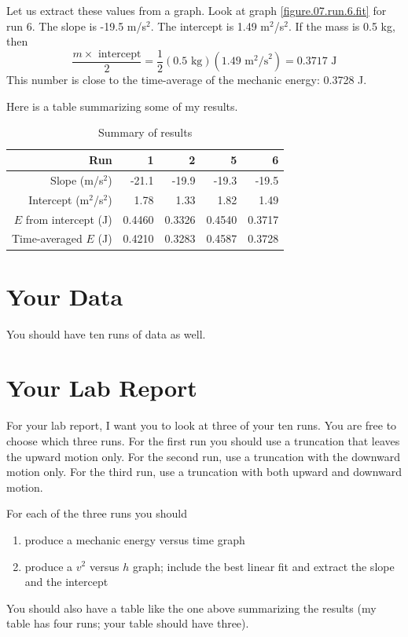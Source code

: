 Let us extract these values from a graph. Look at graph \ref{figure.07.run.6.fit} for run 6. The slope is -19.5 m/s$^{2}$. The intercept is 1.49 m$^{2}$/s$^{2}$. If the mass is 0.5 kg, then
\begin{equation}
    \frac{m \times \text{ intercept}}{2} = \frac{1}{2} (0.5 \text{ kg}) (1.49 \text{ m}^{2}\text{/s}^{2}) = 0.3717 \text{ J}
\end{equation}
This number is close to the time-average of the mechanic energy: 0.3728 J.

Here is a table summarizing some of my results.
\begin{table} \label{table.07.results}
	\centering
    \begin{tabular}{|r|r|r|r|r|}\hline
        Run & 1 & 2 & 5 & 6 \\ \hline
        Slope (m/s$^{2}$) & -21.1 & -19.9 & -19.3 & -19.5 \\
        Intercept (m$^{2}$/s$^{2}$) & 1.78 & 1.33 & 1.82 & 1.49 \\
        $E$ from intercept (J) & 0.4460 & 0.3326 & 0.4540 & 0.3717 \\
        Time-averaged $E$ (J) & 0.4210 & 0.3283 & 0.4587 & 0.3728 \\
        \hline
    \end{tabular}
	\caption{Summary of results}
\end{table}
\section{Your Data}
You should have ten runs of data as well.
\section{Your Lab Report}
For your lab report, I want you to look at three of your ten runs. You are free to choose which three runs. For the first run you should use a truncation that leaves the upward motion only. For the second run, use a truncation with the downward motion only. For the third run, use a truncation with both upward and downward motion.

For each of the three runs you should
\begin{enumerate}
    \item produce a mechanic energy versus time graph
    \item produce a $v^{2}$ versus $h$ graph; include the best linear fit and extract the slope and the intercept
\end{enumerate}
You should also have a table like the one above summarizing the results (my table has four runs; your table should have three).